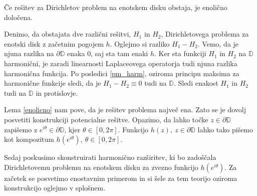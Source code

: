 \documentclass[mat1, tisk]{fmfdelo}
\begin{document}
    \begin{lema}
        \label{enolicno}
        Če rešitev za Dirichletov problem na enotskem disku obstaja, je enolično določena.
    \end{lema}
    \begin{dokaz}
        Denimo, da obstajata dve različni rešitvi, $H_1$ in $H_2$, Dirichletovega problema za enotski disk z začetnim pogojem $h$.
        Oglejmo si razliko $H_1 - H_2$. Vemo, da je njuna razlika na $\partial \mathbb{D}$ enaka $0$, saj sta tam enaki $h$. 
        Ker sta funkciji $H_1$ in $H_2$ na $\mathbb{D}$ harmonični, je zaradi linearnosti Laplaceovega operatorja tudi njuna razlika harmonična funkcija. 
        Po posledici \ref{pm_harm}, oziroma principu maksima za harmonične funkcije sledi, da je $H_1 - H_2 \equiv 0$ tudi na $\mathbb{D}$. Sledi enakost $H_1$ in $H_2$ tudi na $\mathbb{D}$ in protislovje. 
    \end{dokaz}
    
    Lema \ref{enolicno} nam pove, da je rešitev problema največ ena. Zato se je dovolj posvetiti konstrukciji potencialne rešitve. 
    Opazimo, da lahko točke $z \in \partial \mathbb{D}$ zapišemo z \mbox{$e^{i \theta} \in \partial \mathbb{D}$}, kjer $\theta \in [0,2\pi]$. Funkcijo $h(z),~z \in \partial \mathbb{D}$ lahko tako pišemo kot kompozitum $h(e^{i \theta}),~\theta \in [0,2\pi]$.

    Sedaj poskusimo skonstruirati harmonično razširitev, ki bo zadoščala Dirichletovemu problemu na enotskem disku za zvezno funkcijo $h(e^{i \theta})$.
    Za začetek se posvetimo enostavnim primerom in si šele za tem teorijo oziroma konstrukcijo oglejmo v splošnem. 
    
\end{document}
